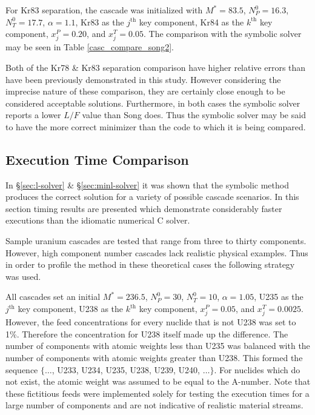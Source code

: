 \documentclass[preprint,12pt]{elsarticle}
\newcommand{\nuc}[2]{{#1}{#2}}
\newcommand{\jth}[0]{$j^{\mbox{th}}$ }
\newcommand{\kth}[0]{$k^{\mbox{th}}$ }
\begin{document}
For \nuc{Kr}{83} separation, the cascade was initialized with $M^*=83.5$, 
$N_P^0=16.3$, $N_T^0=17.7$, $\alpha=1.1$, \nuc{Kr}{83} as the \jth key
component, \nuc{Kr}{84} as the \kth key component, $x_j^P=0.20$, and
$x_j^T=0.05$.  The comparison with the symbolic solver may be seen in Table
\ref{casc_compare_song2}.

Both of the \nuc{Kr}{78} \&  \nuc{Kr}{83} separation comparison have higher 
relative errors than have been previously demonstrated in this study.  
However considering the imprecise nature of these comparison, 
they are certainly close enough to be considered acceptable solutions.  
Furthermore, in both cases the symbolic solver reports a 
lower $L/F$ value than Song does.  Thus the symbolic solver may be said to have
the more correct minimizer than the code to which it is being compared.

\subsection{Execution Time Comparison}
\label{sec:timings-solver}

In \S\ref{sec:l-solver} \& \S\ref{sec:minl-solver} it was shown that the symbolic 
method produces the correct solution for a variety of possible cascade scenarios.
In this section timing results are presented which demonstrate considerably faster
executions than the idiomatic numerical C solver.

Sample uranium cascades are tested that range from three to thirty components.  
However, high component number cascades lack realistic physical examples.  
Thus in order to profile the method in these theoretical cases the following strategy
was used.

All cascades set  an initial $M^*=236.5$,
$N_P^0=30$, $N_T^0=10$, $\alpha=1.05$, \nuc{U}{235} as the \jth key
component, \nuc{U}{238} as the \kth key component, $x_j^P=0.05$, and
$x_j^T=0.0025$.  However, the feed concentrations for every nuclide that is not
\nuc{U}{238} was set to 1\%.
Therefore the concentration for \nuc{U}{238} itself made up the difference.  
The number
of components with atomic weights less than \nuc{U}{235} was balanced with the 
number of components with atomic weights greater than \nuc{U}{238}.  This formed
the sequence $\{\ldots$, \nuc{U}{233}, \nuc{U}{234}, \nuc{U}{235}, \nuc{U}{238}, 
\nuc{U}{239}, \nuc{U}{240}, $\ldots\}$.  For nuclides which do not exist, the 
atomic weight was assumed to be equal to the A-number.  Note that these fictitious
feeds were implemented solely for testing the execution times for a large number
of components and are not indicative of realistic material streams.
\end{document}
